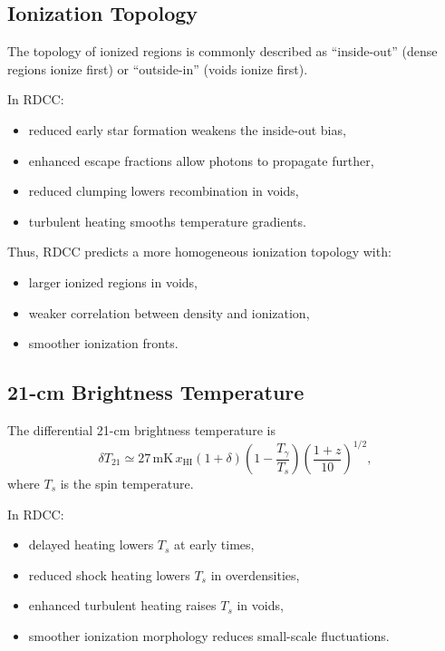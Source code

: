 \documentclass[11pt,a4paper]{article}
\begin{document}
\subsection{Ionization Topology}

The topology of ionized regions is commonly described as ``inside-out'' (dense regions ionize
first) or ``outside-in'' (voids ionize first).

In RDCC:
\begin{itemize}
\item reduced early star formation weakens the inside-out bias,
\item enhanced escape fractions allow photons to propagate further,
\item reduced clumping lowers recombination in voids,
\item turbulent heating smooths temperature gradients.
\end{itemize}

Thus, RDCC predicts a more homogeneous ionization topology with:
\begin{itemize}
\item larger ionized regions in voids,
\item weaker correlation between density and ionization,
\item smoother ionization fronts.
\end{itemize}

\subsection{21-cm Brightness Temperature}

The differential 21-cm brightness temperature is
\begin{equation}
\delta T_{21}
\simeq
27\,\mathrm{mK}\,
x_{\mathrm{HI}}
(1+\delta)
\left(
1
-
\frac{T_{\gamma}}{T_{s}}
\right)
\left(
\frac{1+z}{10}
\right)^{1/2},
\end{equation}
where $T_{s}$ is the spin temperature.

In RDCC:
\begin{itemize}
\item delayed heating lowers $T_{s}$ at early times,
\item reduced shock heating lowers $T_{s}$ in overdensities,
\item enhanced turbulent heating raises $T_{s}$ in voids,
\item smoother ionization morphology reduces small-scale fluctuations.
\end{itemize}
\end{document}
